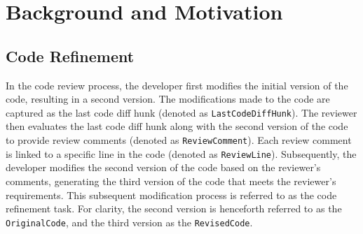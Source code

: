 \section{Background and Motivation}

\subsection{Code Refinement}\label{sec:background}

In the code review process, the developer first modifies the initial version of the code, resulting in a second version.  The modifications made to the code are captured as the last code diff hunk (denoted as \texttt{LastCodeDiffHunk}). The reviewer then evaluates the last code diff hunk along with the second version of the code to provide review comments (denoted as  \texttt{ReviewComment}). Each review comment is linked to a specific line in the code (denoted as \texttt{ReviewLine}). Subsequently, the developer modifies the second version of the code based on the reviewer’s comments, generating the third version of the code that meets the reviewer’s requirements. This subsequent modification process is referred to as the code refinement task. For clarity, the second version is henceforth referred to as the \texttt{OriginalCode}, and the third version as the \texttt{RevisedCode}. 


